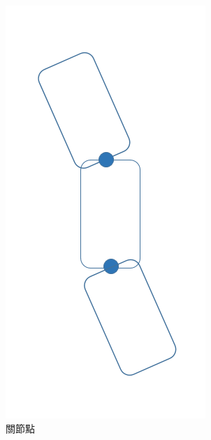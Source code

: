 \begin{figure}[h]
\begin{subfigure}[b]{0.19\linewidth}
    \includegraphics[width=\linewidth]{./resources/physics/Joint.png}
    \caption{關節點}
    \end{subfigure}
    \begin{subfigure}[b]{0.19\linewidth}

\end{subfigure}
\end{figure}
